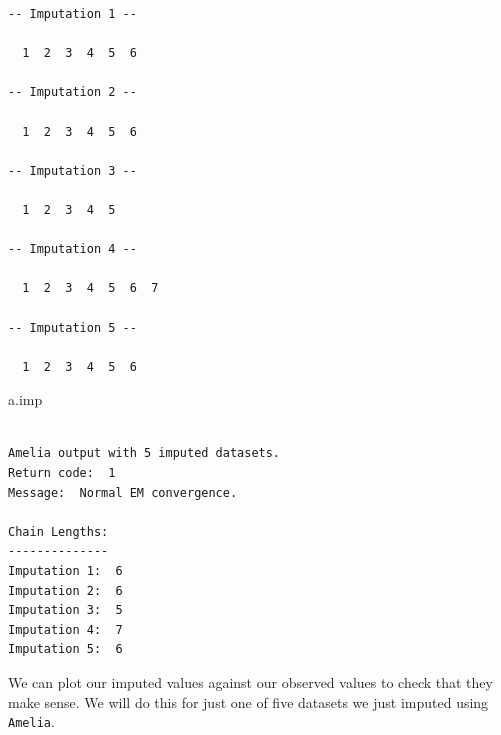 \documentclass[
  letterpaper,
  DIV=11,
  numbers=noendperiod]{scrreprt}
\newenvironment{Shaded}{\begin{snugshade}}{\end{snugshade}}
\newcommand{\AttributeTok}[1]{\textcolor[rgb]{0.49,0.56,0.16}{#1}}
\newcommand{\ConstantTok}[1]{\textcolor[rgb]{0.53,0.00,0.00}{#1}}
\newcommand{\DecValTok}[1]{\textcolor[rgb]{0.25,0.63,0.44}{#1}}
\newcommand{\DocumentationTok}[1]{\textcolor[rgb]{0.73,0.13,0.13}{\textit{#1}}}
\newcommand{\FloatTok}[1]{\textcolor[rgb]{0.25,0.63,0.44}{#1}}
\newcommand{\FunctionTok}[1]{\textcolor[rgb]{0.02,0.16,0.49}{#1}}
\newcommand{\NormalTok}[1]{\textcolor[rgb]{0.00,0.44,0.13}{#1}}
\newcommand{\OtherTok}[1]{\textcolor[rgb]{0.00,0.44,0.13}{#1}}
\newcommand{\SpecialCharTok}[1]{\textcolor[rgb]{0.25,0.44,0.63}{#1}}
\newcommand{\StringTok}[1]{\textcolor[rgb]{0.25,0.44,0.63}{#1}}
\begin{document}
\begin{verbatim}
-- Imputation 1 --

  1  2  3  4  5  6

-- Imputation 2 --

  1  2  3  4  5  6

-- Imputation 3 --

  1  2  3  4  5

-- Imputation 4 --

  1  2  3  4  5  6  7

-- Imputation 5 --

  1  2  3  4  5  6
\end{verbatim}

\begin{Shaded}
\begin{Highlighting}[]
\NormalTok{  a.imp}
\end{Highlighting}
\end{Shaded}

\begin{verbatim}

Amelia output with 5 imputed datasets.
Return code:  1 
Message:  Normal EM convergence. 

Chain Lengths:
--------------
Imputation 1:  6
Imputation 2:  6
Imputation 3:  5
Imputation 4:  7
Imputation 5:  6
\end{verbatim}

We can plot our imputed values against our observed values to check that
they make sense. We will do this for just one of five datasets we just
imputed using \texttt{Amelia}.

\begin{Shaded}
\end{Shaded}
\end{document}
